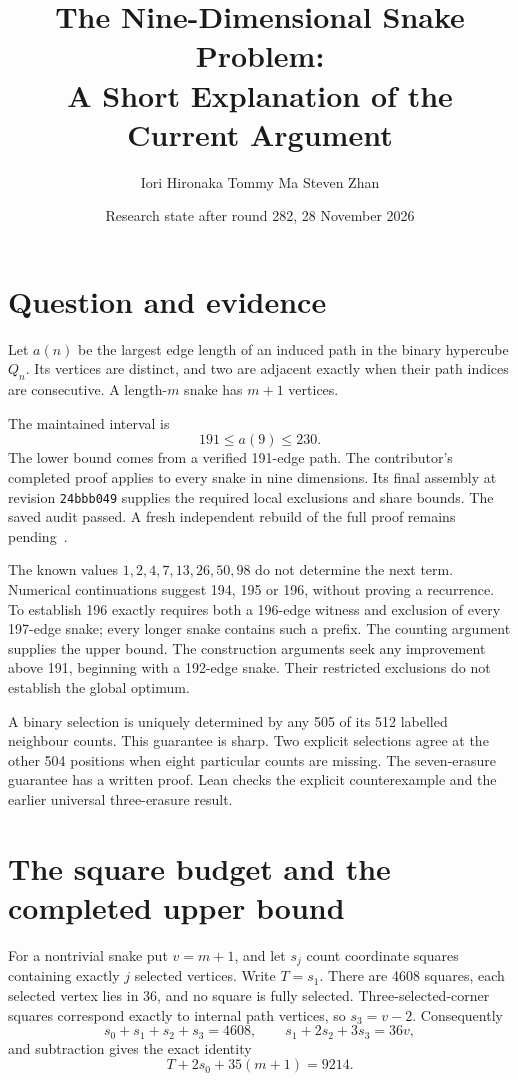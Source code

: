 \documentclass[11pt,a4paper]{article}
\title{The Nine-Dimensional Snake Problem:\\A Short Explanation of the Current Argument}
\author{Iori Hironaka \quad Tommy Ma \quad Steven Zhan}
\date{Research state after round 282, 28 November 2026}
\begin{document}
\maketitle

\section{Question and evidence}
Let $a(n)$ be the largest edge length of an induced path in the binary
hypercube $Q_n$. Its vertices are distinct, and two are adjacent exactly
when their path indices are consecutive. A length-$m$ snake has $m+1$ vertices.

The maintained interval is
\[
\boxed{191\le a(9)\le230.}
\]
The lower bound comes from a verified 191-edge path. The contributor's
completed proof applies to every snake in nine dimensions. Its final
assembly at revision \texttt{24bbb049} supplies the required local
exclusions and share bounds. The saved audit passed. A fresh independent
rebuild of the full proof remains pending~\cite{bound230archive}.

The known values $1,2,4,7,13,26,50,98$ do not determine the next term.
Numerical continuations suggest 194, 195 or 196, without proving a recurrence.
To establish 196 exactly requires both a 196-edge witness and exclusion
of every 197-edge snake; every longer snake contains such a prefix.
The counting argument supplies the upper bound. The construction arguments
seek any improvement above 191, beginning with a 192-edge snake. Their
restricted exclusions do not establish the global optimum.

A binary selection is uniquely determined by any 505 of its 512 labelled
neighbour counts. This guarantee is sharp. Two explicit selections agree
at the other 504 positions when eight particular counts are missing.
The seven-erasure guarantee has a written proof. Lean checks the
explicit counterexample and the earlier universal three-erasure result.

\section{The square budget and the completed upper bound}
For a nontrivial snake put $v=m+1$, and let $s_j$ count coordinate squares
containing exactly $j$ selected vertices. Write $T=s_1$.
There are 4608 squares, each selected vertex lies in 36, and no square
is fully selected. Three-selected-corner squares correspond exactly to
internal path vertices, so $s_3=v-2$. Consequently
\[
s_0+s_1+s_2+s_3=4608,\qquad s_1+2s_2+3s_3=36v,
\]
and subtraction gives the exact identity
\[
\boxed{T+2s_0+35(m+1)=9214.}
\]
\end{document}
